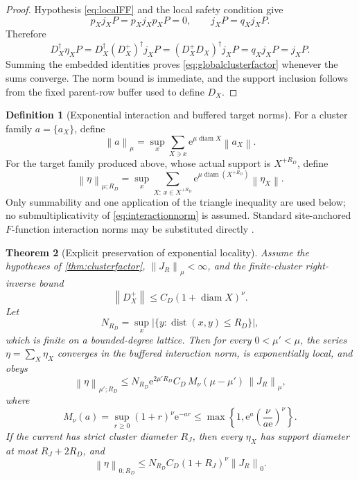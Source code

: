 \documentclass[11pt]{article}
\newtheorem{theorem}{Theorem}[section]
\theoremstyle{definition}
\newtheorem{definition}[theorem]{Definition}
\theoremstyle{remark}
\newcommand{\dist}{\operatorname{dist}}
\newcommand{\e}{\mathrm e}
\newcommand{\norm}[1]{\left\lVert #1\right\rVert}
\newcommand{\abs}[1]{\left\lvert #1\right\rvert}
\newcommand{\diam}{\operatorname{diam}}
\begin{document}
\begin{proof}
Hypothesis \eqref{eq:localFF} and the local safety condition give
\[
 p_Xj_XP=p_Xj_Xp_XP=0,
 \qquad
 j_XP=q_Xj_XP.
\]
Therefore
\[
 D_X^\dagger\eta_XP
 =D_X^\dagger(D_X^+)^\dagger j_XP
 =(D_X^+D_X)^\dagger j_XP
 =q_Xj_XP
 =j_XP.
\]
Summing the embedded identities proves \eqref{eq:globalclusterfactor} whenever the sums converge.  The norm bound is immediate, and the support inclusion follows from the fixed parent-row buffer used to define $D_X$.
\end{proof}

\begin{definition}[Exponential interaction and buffered target norms]
For a cluster family $a=\{a_X\}$, define
\begin{equation}
 \norm{a}_\mu
 =\sup_x\sum_{X\ni x}\e^{\mu\diam X}\norm{a_X}.
 \label{eq:interactionnorm}
\end{equation}
For the target family produced above, whose actual support is $X^{+R_D}$, define
\begin{equation}
 \norm{\eta}_{\mu;R_D}
 =\sup_x\sum_{X:\,x\in X^{+R_D}}
 \e^{\mu\diam(X^{+R_D})}\norm{\eta_X}.
 \label{eq:bufferedinteractionnorm}
\end{equation}
Only summability and one application of the triangle inequality are used below; no submultiplicativity of \eqref{eq:interactionnorm} is assumed.  Standard site-anchored $F$-function interaction norms may be substituted directly \cite{NachtergaeleSims,BachmannEtAl}.
\end{definition}

\begin{theorem}[Explicit preservation of exponential locality]
\label{thm:locality}
Assume the hypotheses of \cref{thm:clusterfactor}, $\norm{J_R}_\mu<\infty$, and the finite-cluster right-inverse bound
\begin{equation}
 \norm{D_X^+}\le C_D(1+\diam X)^\nu.
 \label{eq:polyrightinverse}
\end{equation}
Let
\begin{equation}
 N_{R_D}=\sup_x\abs{\{y:\dist(x,y)\le R_D\}},
 \label{eq:bufferdegree}
\end{equation}
which is finite on a bounded-degree lattice.  Then for every $0<\mu'<\mu$, the series $\eta=\sum_X\eta_X$ converges in the buffered interaction norm, is exponentially local, and obeys
\begin{equation}
 \boxed{
 \norm{\eta}_{\mu';R_D}
 \le N_{R_D}\e^{2\mu'R_D}
 C_D\,M_\nu(\mu-\mu')\,\norm{J_R}_\mu,}
 \label{eq:etalocalbound}
\end{equation}
where
\begin{equation}
 M_\nu(a)=\sup_{r\ge0}(1+r)^\nu\e^{-ar}
 \le\max\left\{1,\e^a\left(\frac{\nu}{a\e}\right)^\nu\right\}.
 \label{eq:Mnu}
\end{equation}
If the current has strict cluster diameter $R_J$, then every $\eta_X$ has support diameter at most $R_J+2R_D$, and
\begin{equation}
 \norm{\eta}_{0;R_D}
 \le N_{R_D}C_D(1+R_J)^\nu\norm{J_R}_0.
 \label{eq:finiteRbound}
\end{equation}
\end{theorem}
\end{document}
